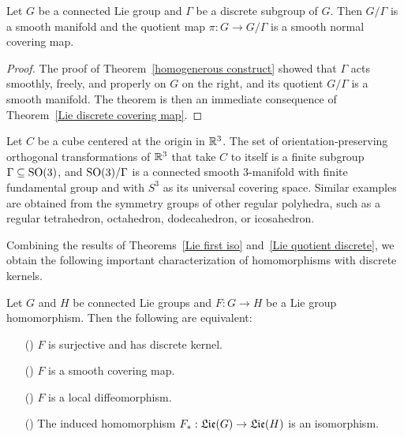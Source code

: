\begin{theorem}\label{Lie quotient discrete}
Let $G$ be a connected Lie group and $\Gamma$ be a discrete subgroup of $G$. Then $G/\Gamma$ is a smooth manifold and the quotient map $\pi:G\to G/\Gamma$ is a smooth normal covering map.
\end{theorem}
\begin{proof}
The proof of Theorem~\ref{homogenerous construct} showed that $\Gamma$ acts smoothly, freely, and properly on $G$ on the right, and its quotient $G/\Gamma$ is a smooth manifold. The theorem is then an immediate consequence of Theorem~\ref{Lie discrete covering map}.
\end{proof}
\begin{example}
Let $C$ be a cube centered at the origin in $\mathbb{R}^3$. The set of orientation-preserving orthogonal transformations of $\mathbb{R}^3$ that take $C$ to itself is a finite subgroup $\Gamma\subseteq\mathrm{SO}(3)$, and $\mathrm{SO}(3)/\Gamma$ is a connected smooth $3$-manifold with finite fundamental group and with $S^3$ as its universal covering space. Similar examples are obtained from the symmetry groups of other regular polyhedra, such as a regular tetrahedron, octahedron, dodecahedron, or icosahedron.
\end{example}
Combining the results of Theorems~\ref{Lie first iso} and~\ref{Lie quotient discrete}, we obtain the following important characterization of homomorphisms with discrete kernels.
\begin{theorem}\label{Lie homomorphism with discrete kernel}
Let $G$ and $H$ be connected Lie groups and $F:G\to H$ be a Lie group homomorphism. Then the following are equivalent:
\begin{itemize}
\item[(\rmnum{1})] $F$ is surjective and has discrete kernel.
\item[(\rmnum{2})] $F$ is a smooth covering map.
\item[(\rmnum{3})] $F$ is a local diffeomorphism.
\item[(\rmnum{4})] The induced homomorphism $F_*:\mathfrak{Lie}(G)\to\mathfrak{Lie}(H)$ is an isomorphism.
\end{itemize}
\end{theorem}
